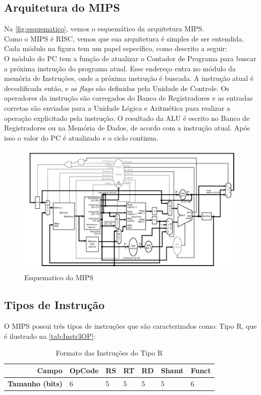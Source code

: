 \documentclass[
	12pt,
	openright,
	a4paper,
	english,			
	french,				
	spanish,			
	brazil,				
	]{abntex2}
\begin{document}
\subsection{Arquitetura do MIPS}
Na \autoref{fig:esquematico}, vemos o esquemático da arquitetura MIPS.\\
Como o MIPS é RISC, vemos que sua arquitetura é simples de ser entendida. Cada módulo na figura tem um papel específico, como descrito a seguir:\\
O módulo do PC tem a função de atualizar o Contador de Programa para buscar a próxima instrução do programa atual. Esse endereço entra no módulo da memória de Instruções, onde a próxima
instrução é buscada. A instrução atual é decodificada então, e as \emph{flags} são definidas pela Unidade de Controle. Os operadores da instrução são carregados do Banco de Registradores 
e as entradas corretas são enviadas para a Unidade Lógica e Aritmética para realizar a operação explicitado pela instrução. O resultado da ALU é escrito no Banco de Registradores ou na Memória de Dados, de acordo com a instrução atual. 
Após isso o valor do PC é atualizado e o ciclo continua.\\


\begin{figure}[H]
\centering 
\caption{Esquematico do MIPS} \label{fig:esquematico}
\includegraphics[scale=0.3]{esquematico.png}
\end{figure}

\subsection{Tipos de Instrução}
O MIPS possui três tipos de instruções que são caracterizados como: Tipo R, que é ilustrado na \autoref{tab:Instr3OP}:
\begin{table}[htb]
\centering
\ABNTEXfontereduzida
\caption{Formato das Instruções do Tipo R} \label{tab:Instr3OP}
\begin{tabular}{r|p{2cm}|p{1.7cm}|p{1.7cm}|p{1.7cm}|p{1.7cm}|p{3cm}} 
\textbf{Campo} & OpCode & RS & RT & RD & Shamt & Funct \\ \hline
\textbf{Tamanho (bits)} & 6 & 5 & 5 & 5 & 5 & 6 \\ \hline
\end{tabular}
\end{table}
\end{document}
